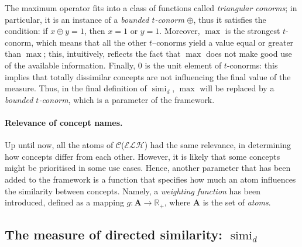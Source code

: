 \documentclass[]{llncs}
\DeclareMathOperator{\simi}{simi}
\newcommand{\elh}{\(\mathcal{ELH}{}\)}
\begin{document}
  The maximum operator fits into a class of functions called \emph{triangular conorms}; %
  in particular, it is an instance of a \emph{bounded \(t\)-conorm} \(\oplus{}\), thus it satisfies the condition: if \(x \oplus y = 1\), then \(x = 1\) or \(y = 1\).
  Moreover, \(\max\) is the strongest \(t\)-conorm, which means that all the other \(t\)--conorms yield a value equal or greater than \(\max\); this, intuitively, reflects the fact that \(\max\) does not make good use of the available information.
  Finally, \(0\) is the unit element of \(t\)-conorms: this implies that totally dissimilar concepts are not influencing the final value of the measure.
  Thus, in the final definition of \(\simi_d\), \(\max\) will be replaced by a \emph{bounded \(t\)-conorm}, which is a parameter of the framework.

  \paragraph{Relevance of concept names.}
  Up until now, all the atoms of \(\mathcal{C}\)(\elh) had the same relevance, in determining how concepts differ from each other.
  However, it is likely that some concepts might be prioritised in some use cases.
  Hence, another parameter that has been added to the framework is a function that specifies how much an atom influences the similarity between concepts. Namely, a \emph{weighting function} has been introduced, defined as a mapping \(g \colon \mathbf{A} \to \mathbb{R}_+\), where \(\mathbf{A}\) is the set of \emph{atoms}.

  \subsection{The measure of directed similarity: \(\simi_d\)}
\end{document}
